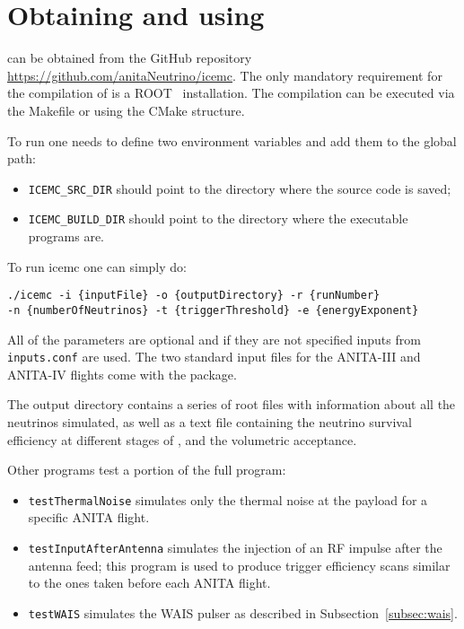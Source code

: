 \appendix

\section{Obtaining and using \icemc}
\icemc can be obtained from the GitHub repository \url{https://github.com/anitaNeutrino/icemc}.
The only mandatory requirement for the compilation of \icemc is a ROOT~\cite{brun1997root} installation.
The compilation can be executed via the Makefile or using the CMake structure.

To run \icemc one needs to define two environment variables and add them to the global path:
\begin{itemize}
    \item  \texttt{ICEMC\_SRC\_DIR} should point to the directory where the source code is saved;
    \item  \texttt{ICEMC\_BUILD\_DIR} should point to the directory where the executable programs are.
\end{itemize}

To run icemc one can simply do:
\begin{verbatim}
./icemc -i {inputFile} -o {outputDirectory} -r {runNumber}
-n {numberOfNeutrinos} -t {triggerThreshold} -e {energyExponent}
\end{verbatim}

All of the parameters are optional and if they are not specified inputs from \texttt{inputs.conf} are used. 
The two standard input files for the ANITA-III and ANITA-IV flights come with the package.

The output directory contains a series of root files with  information about all the neutrinos simulated, as well as a text file containing the neutrino survival efficiency at different stages of \icemc, and the volumetric acceptance.

Other programs test a portion of the full \icemc program:
\begin{itemize}
    \item {\tt testThermalNoise} simulates only the thermal noise at the payload for a specific ANITA flight.
    \item {\tt testInputAfterAntenna} simulates the injection of an RF impulse after the antenna feed; this program is used to produce trigger efficiency scans similar to the ones taken before each ANITA flight.
    \item {\tt testWAIS} simulates the WAIS pulser as described in Subsection~\ref{subsec:wais}.
\end{itemize}

